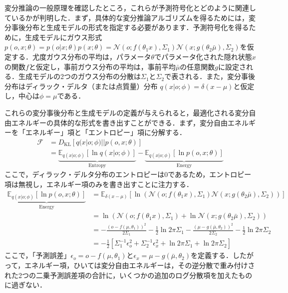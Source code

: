 \documentclass[a4paper, titlepage]{jsarticle}
\begin{document}
変分推論の一般原理を確認したところ，これらが予測符号化とどのように関連しているかが判明した．まず，具体的な変分推論アルゴリズムを得るためには，変分事後分布と生成モデルの形式を指定する必要があります．予測符号化を得るために，生成モデルにガウス形式\;$p(o,x;\theta)=p(o|x;\theta)p(x;\theta)=\mathcal{N}(o;f(\theta_1x),\Sigma_1)\mathcal{N}(x;g(\theta_2\bar{\mu}),\Sigma_2)$\;を仮定する．尤度ガウス分布の平均は，パラメータ$\theta$でパラメータ化された隠れ状態$x$の関数$f$と仮定し，事前ガウス分布の平均は，事前平均$\bar{\mu}$の任意関数$g$に設定される．生成モデルの2つのガウス分布の分散は$\Sigma_1$と$\Sigma_2$で表される．また，変分事後分布はディラック・デルタ（または点質量）分布 \;$q(x|o;\phi)=\delta(x-\mu)$\;と仮定し，中心は\;$\phi=\mu$\;である．
\par
これらの変分事後分布と生成モデルの定義が与えられると，最適化される変分自由エネルギーの具体的な形式を書き出すことができる．まず，変分自由エネルギーを「エネルギー」項と「エントロピー」項に分解する．
\begin{equation}
   \begin{aligned}
      \mathcal{F}&=D_{\mathrm{KL}}[q(x|o;\phi)||p(o,x;\theta)] \\
      &=\underbrace{\mathbb{E}_{q(x|o;\phi)}[\ln q(x|o;\phi)]}_{\mathrm{Entropy}}-\underbrace{\mathbb{E}_{q(x|o;\phi)}[\ln p(o,x;\theta)]}_{\mathrm{Energy}}
   \end{aligned}
\end{equation}
ここで，ディラック・デルタ分布のエントロピーは0であるため，エントロピー項は無視し，エネルギー項のみを書き出すことに注力する．
\begin{equation}
   \begin{aligned}
      \underbrace{\mathbb{E}_{q(x|o;\phi)}[\ln p(o,x;\theta)]}_{\mathrm{Energy}}&=\mathbb{E}_{\delta(x-\mu)}[\ln(\mathcal{N}(o;f(\theta_1x),\Sigma_1)\mathcal{N}(x;g(\theta_2\bar{\mu}),\Sigma_2))] \\
      &=\ln(\mathcal{N}(o;f(\theta_1x),\Sigma_1)+\ln\mathcal{N}(x;g(\theta_2\bar{\mu}),\Sigma_2)) \\
      &=-\frac{(o-f(\mu,\theta_1))^2}{2\Sigma_1}-\frac{1}{2}\ln2\pi\Sigma_1-\frac{(\mu-g(\bar{\mu},\theta_2))^2}{2\Sigma_2}-\frac{1}{2}\ln2\pi\Sigma_2 \\
      &=-\frac{1}{2}[\Sigma_1^{-1}\epsilon_o^2+\Sigma_2^{-1}\epsilon_x^2+\ln2\pi\Sigma_1+\ln2\pi\Sigma_2]
   \end{aligned}
\end{equation}
ここで，「予測誤差」$\epsilon_o=o-f(\mu,\theta_1)$\;と\;$\epsilon_x=\mu-g(\bar{\mu},\theta_2)$\;を定義する．したがって，エネルギー項，ひいては変分自由エネルギーは，その逆分散で重み付けされた2つの二乗予測誤差項の合計に，いくつかの追加のログ分散項を加えたものに過ぎない．
\end{document}
